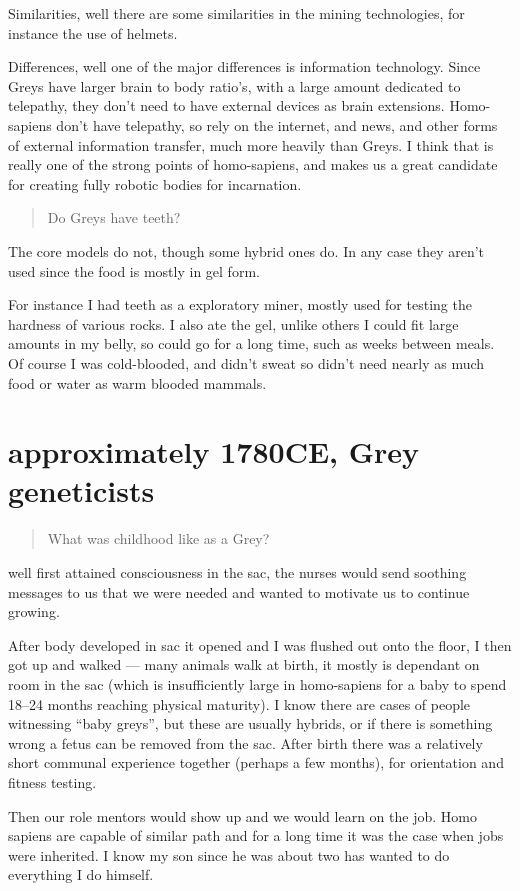Similarities, well there are some similarities in the mining technologies, for
instance the use of helmets.

Differences, well one of the major differences is information technology. Since
Greys have larger brain to body ratio's, with a large amount dedicated to
telepathy, they don't need to have external devices as brain extensions.
Homo-sapiens don't have telepathy, so rely on the internet, and news, and other
forms of external information transfer, much more heavily than Greys. I think
that is really one of the strong points of homo-sapiens, and makes us a great
candidate for creating fully robotic bodies for incarnation.

\blockquote{Do Greys have teeth?}

The core models do not, though some hybrid ones do. In any case they aren't used
since the food is mostly in gel form.

For instance I had teeth as a exploratory miner, mostly used for testing the 
hardness of various rocks. I also ate the gel, unlike others I could fit large
amounts in my belly, so could go for a long time, such as weeks between meals.
Of course I was cold-blooded, and didn't sweat so didn't need nearly as much 
food or water as warm blooded mammals. 

\chapter{approximately 1780CE, Grey geneticists}
\blockquote{What was childhood like as a Grey?}{}

well first attained consciousness in the sac, the nurses would send soothing
messages to us that we were needed and wanted to motivate us to continue
growing.

After body developed in sac it opened and I was flushed out onto the floor, I
then got up and walked --- many animals walk at birth, it mostly is dependant on
room in the sac (which is insufficiently large in homo-sapiens for a baby to
spend 18--24 months reaching physical maturity). I know there are cases of people
witnessing ``baby greys'', but these are usually hybrids, or if there is
something wrong a fetus can be removed from the sac. After birth there was a
relatively short communal experience together (perhaps a few months), for
orientation and fitness testing.

Then our role mentors would show up and we would learn on the job. Homo sapiens
are capable of similar path and for a long time it was the case when jobs were
inherited. I know my son since he was about two has wanted to do everything I do
himself.


